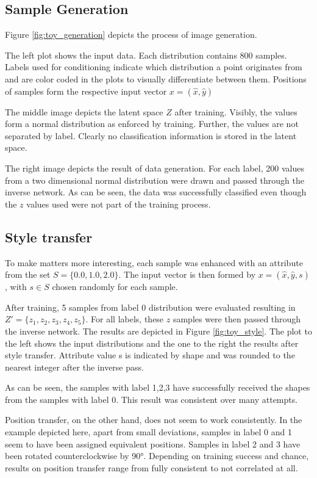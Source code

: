 \documentclass[final]{cvpr}
\begin{document}
\subsection{Sample Generation}\label{sec:toy_sample}
Figure \ref{fig:toy_generation} depicts the process of image generation. 

The left plot shows the input data. Each distribution contains 800 samples. Labels used for conditioning indicate which distribution a point originates from and are color coded in the plots to visually differentiate between them.
Positions of samples form the respective input vector $x = (\hat{x}, \hat{y})$

The middle image depicts the latent space $Z$ after training. Visibly, the values form a normal distribution as enforced by training. Further, the values are not separated by label. Clearly no classification information is stored in the latent space.

The right image depicts the result of data generation. For each label, 200 values from a two dimensional normal distribution were drawn and passed through the inverse network.
As can be seen, the data was successfully classified even though the $z$ values used were not part of the training process.

\subsection{Style transfer}
To make matters more interesting, each sample was enhanced with an attribute from the set $S = \{0.0, 1.0, 2.0\}$. The input vector is then formed by $x = (\hat{x}, \hat{y}, s)$, with $s \in S$ chosen randomly for each sample.

After training, 5 samples from label 0 distribution were evaluated resulting in $Z'=\{z_1, z_2, z_3, z_4, z_5\}$. For all labels, these $z$ samples were then passed through the inverse network. 
The results are depicted in Figure \ref{fig:toy_style}. The plot to the left shows the input distributions and the one to the right the results after style transfer. 
Attribute value s is indicated by shape and was rounded to the nearest integer after the inverse pass.

As can be seen, the samples with label 1,2,3 have successfully received the shapes from the samples with label 0. This result was consistent over many attempts. 

Position transfer, on the other hand, does not seem to work consistently. In the example depicted here, apart from small deviations, samples in label 0 and 1 seem to have been assigned equivalent positions. Samples in label 2 and 3 have been rotated counterclockwise by 90°.
Depending on training success and chance, results on position transfer range from fully consistent to not correlated at all.
\end{document}
